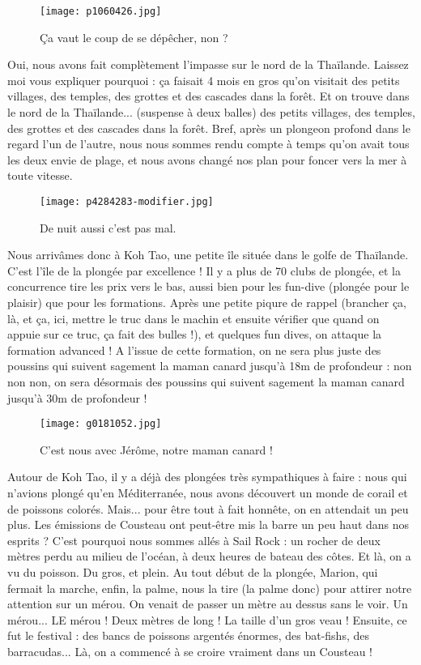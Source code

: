 \documentclass{book}
\begin{document}
\begin{figure}[h]
\centering
\texttt{[image: p1060426.jpg]}
\caption*{Ça vaut le coup de se dépêcher, non ?}
\end{figure}

Oui, nous avons fait complètement l'impasse sur le nord de la Thaïlande. Laissez moi vous expliquer pourquoi : ça faisait 4 mois en gros qu'on visitait des petits villages, des temples, des grottes et des cascades dans la forêt. Et on trouve dans le nord de la Thaïlande... (suspense à deux balles) des petits villages, des temples, des grottes et des cascades dans la forêt. Bref, après un plongeon profond dans le regard l'un de l'autre, nous nous sommes rendu compte à temps qu'on avait tous les deux envie de plage, et nous avons changé nos plan pour foncer vers la mer à toute vitesse.


\begin{figure}[h]
\centering
\texttt{[image: p4284283-modifier.jpg]}
\caption*{De nuit aussi c'est pas mal.}
\end{figure}

Nous arrivâmes donc à Koh Tao, une petite île située dans le golfe de Thaïlande. C'est l'île de la plongée par excellence ! Il y a plus de 70 clubs de plongée, et la concurrence tire les prix vers le bas, aussi bien pour les fun-dive (plongée pour le plaisir) que pour les formations. Après une petite piqure de rappel (brancher ça, là, et ça, ici, mettre le truc dans le machin et ensuite vérifier que quand on appuie sur ce truc, ça fait des bulles !), et quelques fun dives, on attaque la formation advanced ! A l'issue de cette formation, on ne sera plus juste des poussins qui suivent sagement la maman canard jusqu'à 18m de profondeur : non non non, on sera désormais des poussins qui suivent sagement la maman canard jusqu'à 30m de profondeur !


\begin{figure}[h]
\centering
\texttt{[image: g0181052.jpg]}
\caption*{C'est nous avec Jérôme, notre maman canard !}
\end{figure}

Autour de Koh Tao, il y a déjà des plongées très sympathiques à faire : nous qui n'avions plongé qu'en Méditerranée, nous avons découvert un monde de corail et de poissons colorés. Mais... pour être tout à fait honnête, on en attendait un peu plus. Les émissions de Cousteau ont peut-être mis la barre un peu haut dans nos esprits ? C'est pourquoi nous sommes allés à Sail Rock : un rocher de deux mètres perdu au milieu de l'océan, à deux heures de bateau des côtes. Et là, on a vu du poisson. Du gros, et plein. Au tout début de la plongée, Marion, qui fermait la marche, enfin, la palme, nous la tire (la palme donc) pour attirer notre attention sur un mérou. On venait de passer un mètre au dessus sans le voir. Un mérou... LE mérou ! Deux mètres de long ! La taille d'un gros veau ! Ensuite, ce fut le festival : des bancs de poissons argentés énormes, des bat-fishs, des barracudas... Là, on a commencé à se croire vraiment dans un Cousteau !
\end{document}
